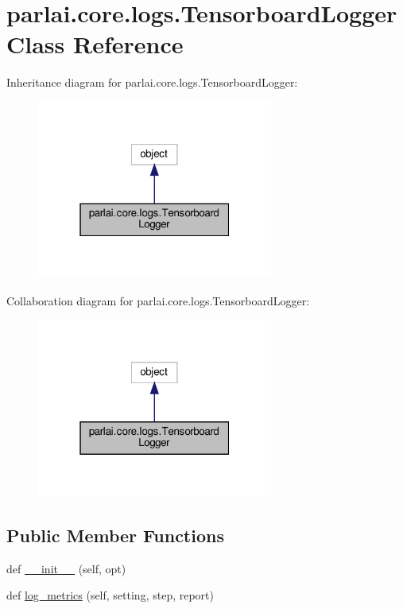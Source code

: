 \hypertarget{classparlai_1_1core_1_1logs_1_1TensorboardLogger}{}\section{parlai.\+core.\+logs.\+Tensorboard\+Logger Class Reference}
\label{classparlai_1_1core_1_1logs_1_1TensorboardLogger}


Inheritance diagram for parlai.\+core.\+logs.\+Tensorboard\+Logger\+:
\nopagebreak
\begin{figure}[H]
\begin{center}
\leavevmode
\includegraphics[width=220pt]{classparlai_1_1core_1_1logs_1_1TensorboardLogger__inherit__graph}
\end{center}
\end{figure}


Collaboration diagram for parlai.\+core.\+logs.\+Tensorboard\+Logger\+:
\nopagebreak
\begin{figure}[H]
\begin{center}
\leavevmode
\includegraphics[width=220pt]{classparlai_1_1core_1_1logs_1_1TensorboardLogger__coll__graph}
\end{center}
\end{figure}
\subsection*{Public Member Functions}
\begin{DoxyCompactItemize}
\item 
def \hyperlink{classparlai_1_1core_1_1logs_1_1TensorboardLogger_a771ea3df52af2ad82a038446fb15fdf3}{\+\_\+\+\_\+init\+\_\+\+\_\+} (self, opt)
\item 
def \hyperlink{classparlai_1_1core_1_1logs_1_1TensorboardLogger_adf20c983722dcd7ff933aaf9dab672f4}{log\+\_\+metrics} (self, setting, step, report)
\end{DoxyCompactItemize}
